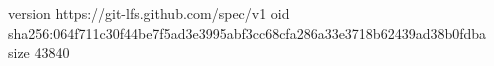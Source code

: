 version https://git-lfs.github.com/spec/v1
oid sha256:064f711c30f44be7f5ad3e3995abf3cc68cfa286a33e3718b62439ad38b0fdba
size 43840
